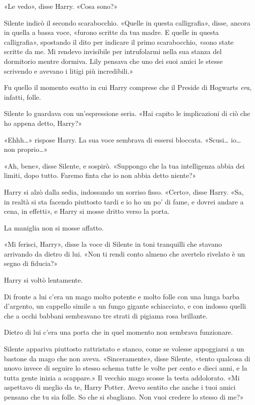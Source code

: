 «Le vedo», disse Harry. «Cosa sono?»

Silente indicò il secondo scarabocchio. «Quelle in questa calligrafia», disse, ancora in quella a bassa voce, «furono scritte da tua madre. E quelle in questa calligrafia», spostando il dito per indicare il primo scarabocchio, «sono state scritte da me. Mi rendevo invisibile per intrufolarmi nella sua stanza del dormitorio mentre dormiva. Lily pensava che uno dei suoi amici le stesse scrivendo e avevano i litigi più incredibili.»

Fu quello il momento esatto in cui Harry comprese che il Preside di Hogwarts \textit{era}, infatti, folle.

Silente lo guardava con un’espressione seria. «Hai capito le implicazioni di ciò che ho appena detto, Harry?»

«Ehhh…» rispose Harry. La sua voce sembrava di essersi bloccata. «Scusi… io… non proprio…»

«Ah, bene», disse Silente, e sospirò. «Suppongo che la tua intelligenza abbia dei limiti, dopo tutto. Faremo finta che io non abbia detto niente?»

Harry si alzò dalla sedia, indossando un sorriso fisso. «Certo», disse Harry. «Sa, in realtà si sta facendo piuttosto tardi e io ho un po’ di fame, e dovrei andare a cena, in effetti», e Harry si mosse dritto verso la porta.

La maniglia non si mosse affatto.

«Mi ferisci, Harry», disse la voce di Silente in toni tranquilli che stavano arrivando da dietro di lui. «Non ti rendi conto almeno che avertelo rivelato è un segno di fiducia?»

Harry si voltò lentamente.

Di fronte a lui c’era un mago molto potente e molto folle con una lunga barba d’argento, un cappello simile a un fungo gigante schiacciato, e con indosso quelli che a occhi babbani sembravano tre strati di pigiama rosa brillante.

Dietro di lui c’era una porta che in quel momento non sembrava funzionare.

Silente appariva piuttosto rattristato e stanco, come se volesse appoggiarsi a un bastone da mago che non aveva. «Sinceramente», disse Silente, «tento qualcosa di nuovo invece di seguire lo stesso schema tutte le volte per cento e dieci anni, e la tutta gente inizia a scappare.» Il vecchio mago scosse la testa addolorato. «Mi aspettavo di meglio da te, Harry Potter. Avevo sentito che anche i tuoi amici pensano che tu sia folle. So che si sbagliano. Non vuoi credere lo stesso di me?»

